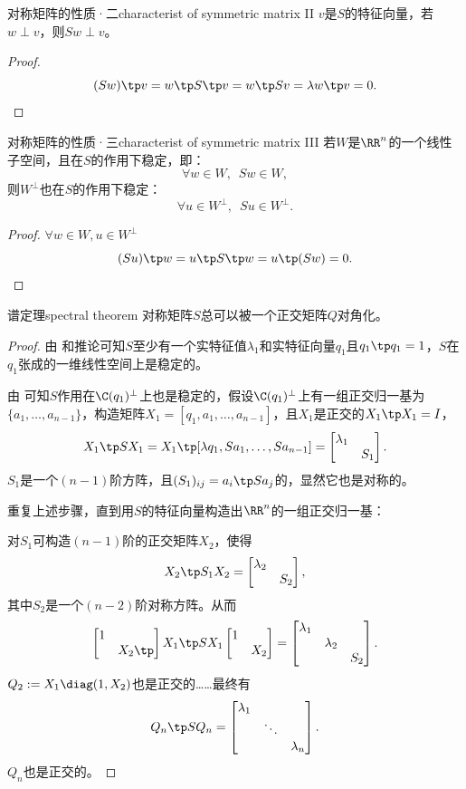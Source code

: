 \begin{theorem}{对称矩阵的性质·二}{characterist of symmetric matrix II}
	$v$是$S$的特征向量，若$w\perp v$，则$Sw\perp v$。
\end{theorem}
\begin{proof}
	
	\[
		(Sw)\tp v=w\tp S\tp v=w\tp Sv=\lambda w\tp v=0.
		\qedhere
	\]
\end{proof}
\begin{theorem}{对称矩阵的性质·三}{characterist of symmetric matrix III}
	若$W$是$\RR^n$的一个线性子空间，且在$S$的作用下稳定，即：
	\[
		\forall w\in W,\enspace Sw\in W,
	\]
	则$W^\perp$也在$S$的作用下稳定：
	\[
		\forall u\in W^\perp,\enspace Su\in W^\perp.
	\]
\end{theorem}
\begin{proof}
	$\forall w\in W,u\in W^\perp$
	\[
		(Su)\tp w=u\tp S\tp w=u\tp(Sw)=0.
		\qedhere
	\]
\end{proof}
\begin{theorem}{谱定理}{spectral theorem}
	对称矩阵$S$总可以被一个正交矩阵$Q$对角化。
\end{theorem}
\begin{proof}
	由 和推论可知$S$至少有一个实特征值$\lambda_1$和实特征向量$q_1$且$q_1\tp q_1=1$，$S$在$q_1$张成的一维线性空间上是稳定的。
	
	由 可知$S$作用在$\C(q_1)^\perp$上也是稳定的，假设$\C(q_1)^\perp$上有一组正交归一基为$\{a_1,\ldots,a_{n-1}\}$，构造矩阵$X_1=[q_1,a_1,\ldots,a_{n-1}]$，且$X_1$是正交的$X_1\tp X_1=I$，
	\[
		X_1\tp SX_1=X_1\tp[\lambda q_1,Sa_1,\ldots,Sa_{n-1}]=\begin{bmatrix}
			\lambda_1\\ &S_1
		\end{bmatrix}.
	\]
	$S_1$是一个$(n-1)$阶方阵，且$(S_1)_{ij}=a_i\tp Sa_j$的，显然它也是对称的。
	
	重复上述步骤，直到用$S$的特征向量构造出$\RR^n$的一组正交归一基：
	
	\noindent
	对$S_1$可构造$(n-1)$阶的正交矩阵$X_2$，使得
	\[
		X_2\tp S_1X_2=\begin{bmatrix}
			\lambda_2\\ &S_2
		\end{bmatrix},
	\]
	其中$S_2$是一个$(n-2)$阶对称方阵。从而
	\[
		\begin{bmatrix}
			1\\ &X_2\tp
		\end{bmatrix}X_1\tp SX_1\begin{bmatrix}
			1\\ &X_2
		\end{bmatrix}=\begin{bmatrix}
			\lambda_1\\ &\lambda_2\\ &&S_2
		\end{bmatrix}.
	\]
	$Q_2:=X_1\diag(1, X_2)$也是正交的……最终有
	\[
		Q_n\tp SQ_n=\begin{bmatrix}
			\lambda_1\\ &\ddots\\ &&\lambda_n
		\end{bmatrix}.
	\]
	$Q_n$也是正交的。
\end{proof}
